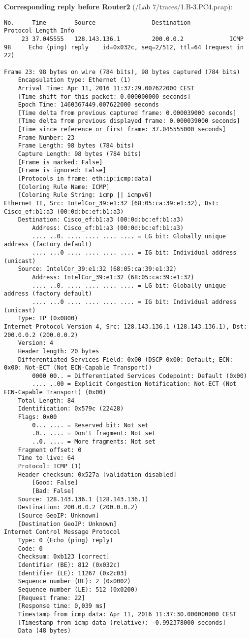 \textbf{Corresponding reply before Router2} (/Lab 7/traces/1.B-3.PC4.pcap):
\begin{lstlisting}
No.     Time        Source                Destination           Protocol Length Info
     23 37.045555   128.143.136.1         200.0.0.2             ICMP     98     Echo (ping) reply    id=0x032c, seq=2/512, ttl=64 (request in 22)

Frame 23: 98 bytes on wire (784 bits), 98 bytes captured (784 bits)
    Encapsulation type: Ethernet (1)
    Arrival Time: Apr 11, 2016 11:37:29.007622000 CEST
    [Time shift for this packet: 0.000000000 seconds]
    Epoch Time: 1460367449.007622000 seconds
    [Time delta from previous captured frame: 0.000039000 seconds]
    [Time delta from previous displayed frame: 0.000039000 seconds]
    [Time since reference or first frame: 37.045555000 seconds]
    Frame Number: 23
    Frame Length: 98 bytes (784 bits)
    Capture Length: 98 bytes (784 bits)
    [Frame is marked: False]
    [Frame is ignored: False]
    [Protocols in frame: eth:ip:icmp:data]
    [Coloring Rule Name: ICMP]
    [Coloring Rule String: icmp || icmpv6]
Ethernet II, Src: IntelCor_39:e1:32 (68:05:ca:39:e1:32), Dst: Cisco_ef:b1:a3 (00:0d:bc:ef:b1:a3)
    Destination: Cisco_ef:b1:a3 (00:0d:bc:ef:b1:a3)
        Address: Cisco_ef:b1:a3 (00:0d:bc:ef:b1:a3)
        .... ..0. .... .... .... .... = LG bit: Globally unique address (factory default)
        .... ...0 .... .... .... .... = IG bit: Individual address (unicast)
    Source: IntelCor_39:e1:32 (68:05:ca:39:e1:32)
        Address: IntelCor_39:e1:32 (68:05:ca:39:e1:32)
        .... ..0. .... .... .... .... = LG bit: Globally unique address (factory default)
        .... ...0 .... .... .... .... = IG bit: Individual address (unicast)
    Type: IP (0x0800)
Internet Protocol Version 4, Src: 128.143.136.1 (128.143.136.1), Dst: 200.0.0.2 (200.0.0.2)
    Version: 4
    Header length: 20 bytes
    Differentiated Services Field: 0x00 (DSCP 0x00: Default; ECN: 0x00: Not-ECT (Not ECN-Capable Transport))
        0000 00.. = Differentiated Services Codepoint: Default (0x00)
        .... ..00 = Explicit Congestion Notification: Not-ECT (Not ECN-Capable Transport) (0x00)
    Total Length: 84
    Identification: 0x579c (22428)
    Flags: 0x00
        0... .... = Reserved bit: Not set
        .0.. .... = Don't fragment: Not set
        ..0. .... = More fragments: Not set
    Fragment offset: 0
    Time to live: 64
    Protocol: ICMP (1)
    Header checksum: 0x527a [validation disabled]
        [Good: False]
        [Bad: False]
    Source: 128.143.136.1 (128.143.136.1)
    Destination: 200.0.0.2 (200.0.0.2)
    [Source GeoIP: Unknown]
    [Destination GeoIP: Unknown]
Internet Control Message Protocol
    Type: 0 (Echo (ping) reply)
    Code: 0
    Checksum: 0xb123 [correct]
    Identifier (BE): 812 (0x032c)
    Identifier (LE): 11267 (0x2c03)
    Sequence number (BE): 2 (0x0002)
    Sequence number (LE): 512 (0x0200)
    [Request frame: 22]
    [Response time: 0,039 ms]
    Timestamp from icmp data: Apr 11, 2016 11:37:30.000000000 CEST
    [Timestamp from icmp data (relative): -0.992378000 seconds]
    Data (48 bytes)


\end{lstlisting}
